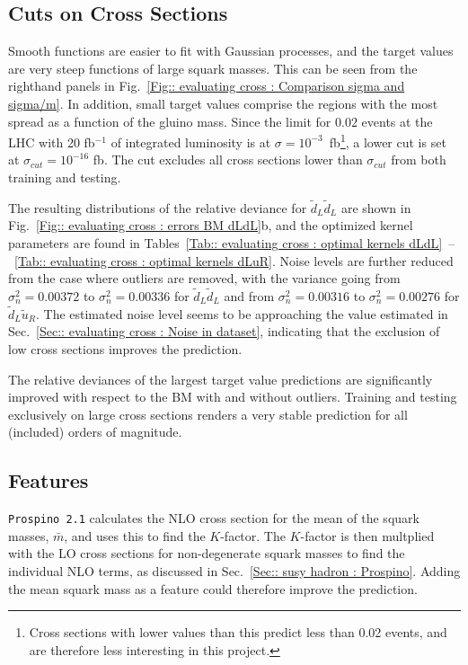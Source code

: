 \documentclass[twoside,english]{uiofysmaster}
\begin{document}
{\subsection{Cuts on Cross Sections}

Smooth functions are easier to fit with Gaussian processes, and the target values are very steep functions of large squark masses. This can be seen from the righthand panels in Fig.~\ref{Fig:: evaluating cross : Comparison sigma and sigma/m}. In addition, small target values comprise the regions with the most spread as a function of the gluino mass. Since the limit for $0.02$ events at the LHC with 20 fb$^{-1}$ of integrated luminosity is at $\sigma = 10^{-3}$~fb\footnote{Cross sections with lower values than this predict less than 0.02 events, and are therefore less interesting in this project.}, a lower cut is set at $\sigma_{cut} = 10^{-16}$ fb. The cut excludes all cross sections lower than $\sigma_{cut}$ from both training and testing. 

The resulting distributions of the relative deviance for $\widetilde{d}_L \widetilde{d}_L$ are shown in Fig.~\ref{Fig:: evaluating cross : errors BM dLdL}b, and the optimized kernel parameters are found in Tables~\ref{Tab:: evaluating cross : optimal kernels dLdL}~--~\ref{Tab:: evaluating cross : optimal kernels dLuR}. Noise levels are further reduced from the case where outliers are removed, with the variance going from $\sigma_n^2=0.00372$ to $\sigma_n^2 = 0.00336$ for $\widetilde{d}_L \widetilde{d}_L$ and from $\sigma_n^2=0.00316$ to $\sigma_n^2=0.00276$ for $\widetilde{d}_L \widetilde{u}_R$. The estimated noise level seems to be approaching the value estimated in Sec.~\ref{Sec:: evaluating cross : Noise in dataset}, indicating that the exclusion of low cross sections improves the prediction. 

The relative deviances of the largest target value predictions are significantly improved with respect to the BM with and without outliers. Training and testing exclusively on large cross sections renders a very stable prediction for all (included) orders of magnitude.

\subsection{Features}

\verb|Prospino 2.1| calculates the NLO cross section for the mean of the squark masses, $\bar{m}$, and uses this to find the $K$-factor. The $K$-factor is then multplied with the LO cross sections for non-degenerate squark masses to find the individual NLO terms, as discussed in Sec.~\ref{Sec:: susy hadron : Prospino}. Adding the mean squark mass as a feature could therefore improve the prediction. 

}
\end{document}
